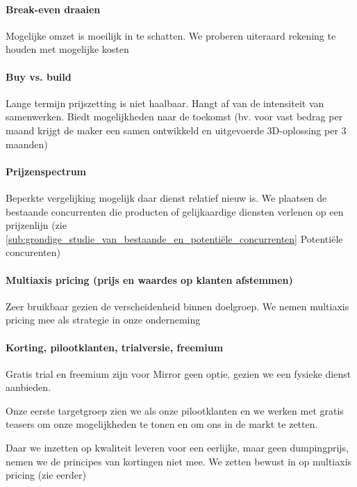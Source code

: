 \paragraph{Break-even draaien}

Mogelijke omzet is moeilijk in te schatten. We proberen uiteraard rekening te houden met mogelijke kosten

\paragraph{Buy vs. build}

Lange termijn prijszetting is niet haalbaar. Hangt af van de intensiteit van samenwerken. Biedt mogelijkheden naar de toekomst (bv. voor vast bedrag per maand krijgt de maker een samen ontwikkeld en uitgevoerde  3D-oplossing per 3 maanden)

\paragraph{Prijzenspectrum}

Beperkte vergelijking mogelijk daar dienst relatief nieuw is. We plaatsen de bestaande concurrenten die producten of gelijkaardige diensten verlenen op een prijzenlijn (zie \ref{sub:grondige_studie_van_bestaande_en_potentiële_concurrenten} Potentiële concurenten)


\paragraph{Multiaxis pricing (prijs en waardes op klanten afstemmen)}

Zeer bruikbaar gezien de verscheidenheid binnen doelgroep. We nemen multiaxis pricing mee als strategie in onze onderneming

\paragraph{Korting, pilootklanten, trialversie, freemium}

Gratis trial en freemium zijn voor Mirror geen optie, gezien we een fysieke dienst aanbieden.

Onze eerste targetgroep zien we als onze pilootklanten en  we werken met gratis teasers om onze mogelijkheden te tonen en om ons in de markt te zetten.

Daar we inzetten op kwaliteit leveren voor een eerlijke, maar geen dumpingprijs, nemen we de principes van kortingen niet mee. We zetten bewust in op multiaxis pricing (zie eerder)

